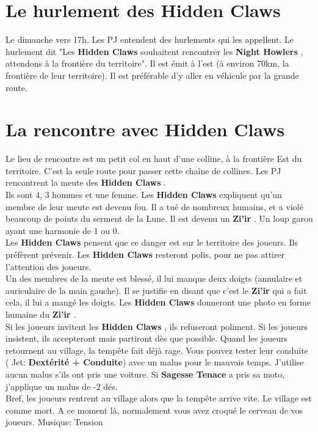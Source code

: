 \documentclass[oneside,12pt]{book}
\newcommand\roll[1]{
( Jet: \textbf{#1})
}
\newcommand{\Jessica}{\textbf{Sagesse Tenace} }
\newcommand{\Thomas}{\textbf{Zi'ir} }
\newcommand{\Night}{\textbf{Night Howlers} }
\newcommand{\Hidden}{\textbf{Hidden Claws} }
\begin{document}
\begin{flushleft}
\section{Le hurlement des \Hidden}
Le dimanche vers 17h, Les PJ entendent des hurlements qui les appellent.  Le hurlement dit "Les \Hidden souhaitent rencontrer les \Night, attendons à la frontière du territoire".
Il est émit à l'est (à environ 70km, la frontière de leur territoire). Il est préférable d'y aller en véhicule par la grande route. 

\section{La rencontre avec \Hidden}
Le lieu de rencontre est un petit col en haut d'une colline, à la frontière Est du territoire. C'est la seule route pour passer cette chaîne de collines.
Les PJ rencontrent la meute des \Hidden.\\ Ils sont 4, 3 hommes et une femme.
Les \Hidden expliquent qu'un membre de leur meute est devenu fou. Il a tué de nombreux humains, et a violé beaucoup de points du serment de la Lune. Il est devenu un \Thomas. Un loup garou ayant une harmonie de 1 ou 0. \\
Les \Hidden pensent que ce danger est sur le territoire des joueurs. Ils préfèrent prévenir. Les \Hidden resteront polis, pour ne pas attirer l'attention des joueurs. \\
Un des membres de la meute est blessé, il lui manque deux doigts (annulaire et auriculaire de la main gauche). Il se justifie en disant que c'est le \Thomas qui a fait cela, il lui a mangé les doigts. Les \Hidden donneront une photo en forme humaine du \Thomas.\\
Si les joueurs invitent les \Hidden, ils refuseront poliment. Si les joueurs insistent, ils accepteront mais partiront dès que possible.
Quand les joueurs retournent au village, la tempête fait déjà rage. Vous pouvez tester leur conduite \roll{Dextérité + Conduite} avec un malus pour le mauvais temps. J'utilise aucun malus s'ils ont pris une voiture. Si \Jessica a pris sa moto, j'applique un malus de -2 dés.\\
Bref, les joueurs rentrent au village alors que la tempête arrive vite. Le village est comme mort. A ce moment là, normalement vous avez croqué le cerveau de vos joueurs.  
Musique: Tension



\end{flushleft}
\end{document}
